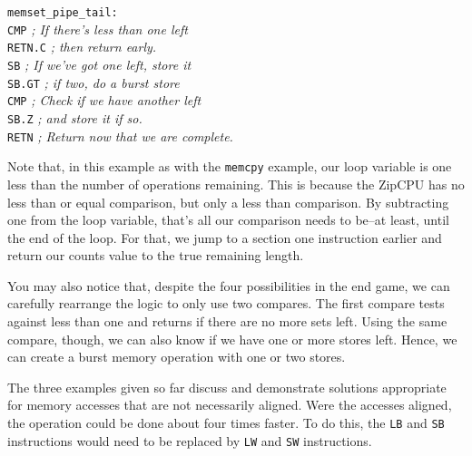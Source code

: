 \documentclass{gqtekspec}
\begin{document}
\begin{table}
\begin{center}
\begin{tabbing}
{\tt memset\_pipe\_tail:}\>\>\\
\>	{\tt CMP}	\> {\em ; If there's less than one left}\\
\>	{\tt RETN.C}\>	\> {\em ; then return early.}\\
\>	{\tt SB} \> {\em ; If we've got one left, store it}\\
\>	{\tt SB.GT} \> {\em ; if two, do a burst store}\\
\>	{\tt CMP}	\> {\em ; Check if we have another left}\\
\>	{\tt SB.Z}	\> {\em ; and store it if so.}\\
\>	{\tt RETN}\>		\> {\em ; Return now that we are complete.}
\end{tabbing}
\caption{Example Memset after loop unrolling, using pipelined memory ops}\label{tbl:memset-pipe}
\end{center}\end{table}
Note that, in this example as with the {\tt memcpy} example, our loop variable
is one less than the number of operations remaining.  This is because the
ZipCPU has no less than or equal comparison, but only a less than comparison. 
By subtracting one from the loop variable, that's all our comparison needs to
be--at least, until the end of the loop.  For that, we jump to a section one
instruction earlier and return our counts value to the true remaining length. 

You may also notice that, despite the four possibilities in the end game, we
can carefully rearrange the logic to only use two compares.  The first compare
tests against less than one and returns if there are no more sets left.  Using
the same compare, though, we can also know if we have one or more stores left.
Hence, we can create a burst memory operation with one or two stores.  

The three examples given so far discuss and demonstrate solutions appropriate
for memory accesses that are not necessarily aligned.  Were the accesses
aligned, the operation could be done about four times faster.  To do this,
the {\tt LB} and {\tt SB} instructions would need to be replaced by {\tt LW}
and {\tt SW} instructions.
\end{document}

